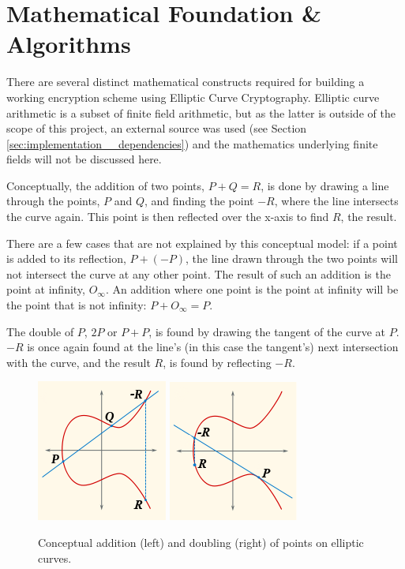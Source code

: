 \section{Mathematical Foundation \& Algorithms}
\label{sec:math}
\label{sec:maths}

There are several distinct mathematical constructs required for building a working encryption scheme using Elliptic
Curve Cryptography. Elliptic curve arithmetic is a subset of finite field arithmetic, but as the latter is outside
of the scope of this project, an external source was used (see Section \ref{sec:implementation__dependencies}) and
the mathematics underlying finite fields will not be discussed here.

Conceptually, the addition of two points, \(P + Q = R\), is done by drawing a line through the points, \(P\) and \(Q\),
and finding the point \(-R\), where the line intersects the curve again. This point is
then reflected over the x-axis to find \(R\), the result.

There are a few cases that are not explained by this conceptual model: if a point is added to its reflection, \(P + (-P)\),
the line drawn through the two points will not intersect the curve at any other point. The result of such an addition is
the point at infinity, \(O_\infty\). An addition where one point is the point at infinity will be the point that is not
infinity: \(P + O_\infty = P\).

The double of \(P\), \(2P\) or \(P+P\), is found by drawing the tangent of the curve at \(P\).
\(-R\) is once again found at the line's (in this case the tangent's) next intersection
with the curve, and the result \(R\), is found by reflecting \(-R\).\cite{hankerson2010}

\begin{figure}[htb]
	\centering
	\includegraphics{maths/addition}
	\includegraphics{maths/doubling}
	\caption{Conceptual addition (left) and doubling (right) of points on elliptic curves.}
\end{figure}

